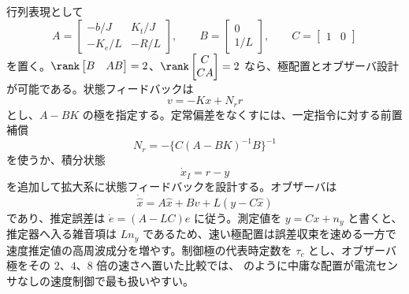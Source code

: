 行列表現として
\begin{equation}
  A=
  \begin{bmatrix}
    -b/J&K_t/J\\
    -K_e/L&-R/L
  \end{bmatrix},
  \qquad
  B=
  \begin{bmatrix}
    0\\1/L
  \end{bmatrix},
  \qquad
  C=
  \begin{bmatrix}
    1&0
  \end{bmatrix}
\end{equation}
を置く。$\rank\begin{bmatrix}B&AB\end{bmatrix}=2$、$\rank\begin{bmatrix}C\\CA\end{bmatrix}=2$ なら、極配置とオブザーバ設計が可能である。状態フィードバックは
\begin{equation}
  v=-Kx+N_rr
\end{equation}
とし、$A-BK$ の極を指定する。定常偏差をなくすには、一定指令に対する前置補償
\begin{equation}
  N_r=
  -\{C(A-BK)^{-1}B\}^{-1}
\end{equation}
を使うか、積分状態
\begin{equation}
  \dot{x}_I=r-y
\end{equation}
を追加して拡大系に状態フィードバックを設計する。オブザーバは
\begin{equation}
  \dot{\hat{x}}=A\hat{x}+Bv+L(y-C\hat{x})
\end{equation}
であり、推定誤差は $\dot{e}=(A-LC)e$ に従う。測定値を $y=Cx+n_y$ と書くと、推定器へ入る雑音項は $Ln_y$ であるため、速い極配置は誤差収束を速める一方で速度推定値の高周波成分を増やす。制御極の代表時定数を $\tau_c$ とし、オブザーバ極をその $2$、$4$、$8$ 倍の速さへ置いた比較では、 のように中庸な配置が電流センサなしの速度制御で最も扱いやすい。

